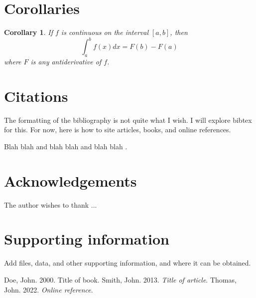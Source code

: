 \documentclass[10pt, letterpaper, twoside]{article}
\theoremstyle{myenv}
\theoremstyle{mytheorem}
\newtheorem{corollary}[theorem]{Corollary}
\theoremstyle{mydefinition}
\begin{document}
\section{Corollaries}
\label{sec:corollaries}
\begin{corollary}
If $f$ is continuous on the interval $[a,b]$, then \[\int_a^b f(x)dx=F(b)-F(a)\] where $F$ is any antiderivative of $f$.
\end{corollary}

\newpage
\section{Citations}
\label{sec:citations}
The formatting of the bibliography is not quite what I wish. I will explore bibtex for this. For now, here is how to site articles, books, and online references.

Blah blah \cite{JD} and blah blah \cite{JS} and blah blah \cite{JT}.

\newpage
\listoffigures

\newpage
\listoftables

\newpage
\listofmyequations

\newpage
\listofmydefinitions

\newpage
\listofmytheorems

\newpage
\listofmycorollaries

\newpage
\section{Acknowledgements}
\label{sec:acknowledgements}

The author wishes to thank ...

\section{Supporting information}
\label{sec:supporting_information}

Add files, data, and other supporting information, and where it can be obtained.

\begin{thebibliography}{99}
 Doe, John. 2000. Title of book.
 Smith, John. 2013. \textit{Title of article}.
 Thomas, John. 2022. \textit{Online reference}.
\end{thebibliography}
\end{document}
